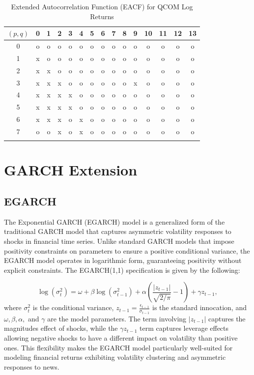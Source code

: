 \begin{table}[H]
	\centering
	\caption{Extended Autocorrelation Function (EACF) for QCOM Log Returns}
	\begin{tabular}{c|cccccccccccccc}
		$(p, q)$ & 0 & 1 & 2 & 3 & 4 & 5 & 6 & 7 & 8 & 9 & 10 & 11 & 12 & 13 \\
		\hline
0 & o & o & o & o & o & o & o & o & o & o & o & o & o & o \\
1 & x & o & o & o & o & o & o & o & o & o & o & o & o & o \\
2 & x & x & o & o & o & o & o & o & o & o & o & o & o & o \\
3 & x & x & x & o & o & o & o & o & o & x & o & o & o & o \\
4 & x & x & x & x & o & o & o & o & o & o & o & o & o & o \\
5 & x & x & x & x & o & o & o & o & o & o & o & o & o & o \\
6 & x & x & x & o & x & o & o & o & o & o & o & o & o & o \\
7 & o & o & x & o & x & o & o & o & o & o & o & o & o & o \\
		\label{tab:eacf_garch}
	\end{tabular}
\end{table}

\section{GARCH Extension}

\subsection{EGARCH}

The Exponential GARCH (EGARCH) model  is a generalized form of the traditional GARCH model that captures asymmetric volatility responses to shocks in financial time series. Unlike standard GARCH models that impose positivity constraints on parameters to ensure a positive conditional variance, the EGARCH model operates in logarithmic form, guaranteeing positivity without explicit constraints. The EGARCH(1,1) specification is given by the following:

\begin{equation}
	\log\left(\sigma_t^2\right)=\omega+\beta\log\left(\sigma_{t-1}^2\right)+\alpha\left(\frac{|z_{t-1}|}{\sqrt{2/\pi}}-1 \right)+\gamma z_{t-1},
\end{equation}
where $\sigma_t^2$ is the conditional variance, $z_{t-1}=\frac{\epsilon_{t-1}}{\sigma_{t-1}}$ is the standard innocation, and $\omega,\beta,\alpha,$ and $\gamma$ are the model parameters. The term involving $|z_{t-1}|$ captures the magnitudes effect of shocks, while the $\gamma z_{t-1}$ term captures leverage effects allowing negative shocks to have a different impact on volatility than positive ones. This flexibility makes the EGARCH model particularly well-suited for modeling financial returns exhibiting volatility clustering and asymmetric responses to news.

